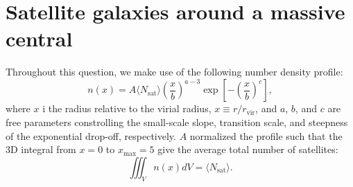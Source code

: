 \section{Satellite galaxies around a massive central}
Throughout this question, we make use of the following number density profile:
\begin{equation}
	n(x) = A\langle N_\text{sat}\rangle \left(\frac{x}{b}\right)^{a-3} \exp\left[-\left(\frac{x}{b}\right)^c\right],
\end{equation}
where $x$ i the radius relative to the virial radius, $x\equiv r/r_\text{vir}$, and $a$, $b$, and $c$ are free parameters constrolling the small-scale slope, transition scale, and steepness of the exponential drop-off, respectively. $A$ normalized the profile such that the 3D integral from $x=0$ to $x_\text{max}=5$ give the average total number of satellites:
\begin{equation}
	\iiint_V n(x)dV = \langle N_\text{sat}\rangle.
	\label{eq:Nsat}
\end{equation}


